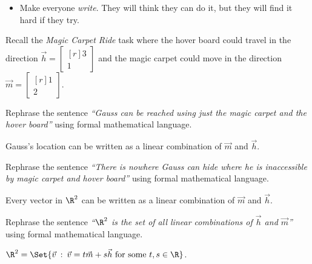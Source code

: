 \documentclass{problemset}
\newcommand{\mat}[1]{\begin{bmatrix*}[r]#1\end{bmatrix*}}
\providecommand\given{}
\newcommand\SetSymbol[1][]{%
	\nonscript\::%
	\allowbreak
	\nonscript\:
	\mathopen{}}
\renewcommand\given{\SetSymbol[\delimsize]}
\begin{document}
	\question
	\begin{annotation}
		\begin{goals}
		\end{goals}

		\begin{notes}
			\begin{itemize}
				\item Make everyone \emph{write}. They will think
					they can do it, but they will find it hard if
					they try.
			\end{itemize}
		\end{notes}
	\end{annotation}
	Recall the \emph{Magic Carpet Ride} task where the hover board could 
	travel in the direction $\vec h=\mat{3\\1}$ and the magic carpet could 
	move in the direction $\vec m=\mat{1\\2}$.
	\begin{parts}
		\item Rephrase the sentence \emph{``Gauss can be reached using just the 
			magic carpet and the hover board''} using formal mathematical 
			language.
			\begin{solution}
				Gauss's location can be written as a linear combination of 
				$\vec m$ and $\vec h$.
			\end{solution}
		\item Rephrase the sentence \emph{``There is nowhere Gauss can hide 
			where he is inaccessible by magic carpet and hover board''} using 
			formal mathematical language.
			\begin{solution}
				Every vector in $\R^2$ can be written as a linear combination 
				of $\vec m$ and	$\vec h$.
			\end{solution}
		\item Rephrase the sentence \emph{``$\R^2$ is the set of all linear 
			combinations of $\vec h$ and $\vec m$''} using formal mathematical 
			language.
			\begin{solution}
				$\R^2=\Set{\vec v\given \vec v=t\vec m+s\vec h\text{ for some }t,s\in \R}$.
			\end{solution}
	\end{parts}
\end{document}
